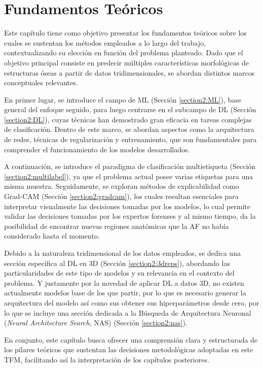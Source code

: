 \chapter{Fundamentos Teóricos}
Este capítulo tiene como objetivo presentar los fundamentos teóricos sobre los cuales se sustentan los métodos empleados a lo largo del trabajo, contextualizando su elección en función del problema planteado. Dado que el objetivo principal consiste en predecir múltiples características morfológicas de estructuras óseas a partir de datos tridimensionales, se abordan distintos marcos conceptuales relevantes.

En primer lugar, se introduce el campo de ML (Sección \ref{section2:ML}), base general del enfoque seguido, para luego centrarse en el subcampo de DL (Sección \ref{section2:DL}), cuyas técnicas han demostrado gran eficacia en tareas complejas de clasificación. Dentro de este marco, se abordan aspectos como la arquitectura de redes, técnicas de regularización y entrenamiento, que son fundamentales para comprender el funcionamiento de los modelos desarrollados.

A continuación, se introduce el paradigma de clasificación multietiqueta (Sección \ref{section2:multilabel}), ya que el problema actual posee varias etiquetas para una misma muestra. Seguidamente, se exploran métodos de explicabilidad como Grad-CAM (Sección \ref{section2:gradcam}), los cuales resultan esenciales para interpretar visualmente las decisiones tomadas por los modelos, lo cual permite validar las decisiones tomadas por los expertos forenses y al mismo tiempo, da la posibilidad de encontrar nuevas regiones anatómicas que la AF no había considerado hasta el momento.

Debido a la naturaleza tridimensional de los datos empleados, se dedica una sección específica al DL en 3D (Sección \ref{section2:3dreps}), abordando las particularidades de este tipo de modelos y su relevancia en el contexto del problema. Y justamente por la novedad de aplicar DL a datos 3D, no existen actualmente modelos base de los que partir, por lo que es necesario generar la arquitectura del modelo así como sus obtener sus hiperparámetros desde cero, por lo que se incluye una sección dedicada a la Búsqueda de Arquitectura Neuronal (\textit{Neural Architecture Search}, NAS) (Sección \ref{section2:nas}).

En conjunto, este capítulo busca ofrecer una comprensión clara y estructurada de los pilares teóricos que sustentan las decisiones metodológicas adoptadas en este TFM, facilitando así la interpretación de los capítulos posteriores.

